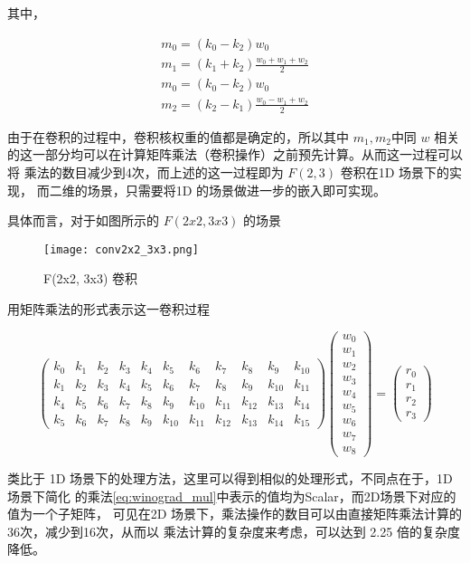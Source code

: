 其中，

\begin{align}
  m_0 = (k_0 - k_2) w_0\\
  m_1 = (k_1 + k_2) \frac{w_0 + w_1 + w_2}{2}\\
  m_0 = (k_0 - k_2) w_0\\
  m_2 = (k_2 - k_1) \frac{w_0 - w_1 + w_2}{2}
\end{align}

由于在卷积的过程中，卷积核权重的值都是确定的，所以其中 $m_1, m_2$中同 $w$ 相关
的这一部分均可以在计算矩阵乘法（卷积操作）之前预先计算。从而这一过程可以将
乘法的数目减少到4次，而上述的这一过程即为 $F(2, 3)$ 卷积在1D 场景下的实现，
而二维的场景，只需要将1D 的场景做进一步的嵌入即可实现。

具体而言，对于如图所示的 $F(2x2, 3x3)$ 的场景
\begin{figure}
\centering
\texttt{[image: conv2x2\_3x3.png]}
\caption{F(2x2, 3x3) 卷积}
\label{fig:conv2x2_3x3}
\end{figure}

用矩阵乘法的形式表示这一卷积过程

\[
\label{eq:f2x3}
  \begin{pmatrix}
    k_0 & k_1 & k_2 & k_3 & k_4 & k_5 & k_6 & k_7 & k_8 & k_9 & k_10 \\
    k_1 & k_2 & k_3 & k_4 & k_5 & k_6 & k_7 & k_8 & k_9 & k_10 & k_11 \\
    k_4 & k_5 & k_6 & k_7 & k_8 & k_9 & k_10 & k_11  & k_12 & k_13 & k_14 \\
    k_5 & k_6 & k_7 & k_8 & k_9 & k_10 & k_11 & k_12 & k_13 & k_14 & k_15
  \end{pmatrix}
  \begin{pmatrix}
    w_0 \\
    w_1 \\
    w_2 \\
    w_3 \\
    w_4 \\
    w_5 \\
    w_6 \\
    w_7 \\
    w_8
  \end{pmatrix}
  = 
  \begin{pmatrix}
    r_0 \\
    r_1 \\
    r_2 \\
    r_3
  \end{pmatrix}
\]

类比于 1D 场景下的处理方法，这里可以得到相似的处理形式，不同点在于，1D 场景下简化
的乘法\ref{eq:winograd_mul}中表示的值均为Scalar，而2D场景下对应的值为一个子矩阵，
可见在2D 场景下，乘法操作的数目可以由直接矩阵乘法计算的36次，减少到16次，从而以
乘法计算的复杂度来考虑，可以达到 2.25 倍的复杂度降低。

